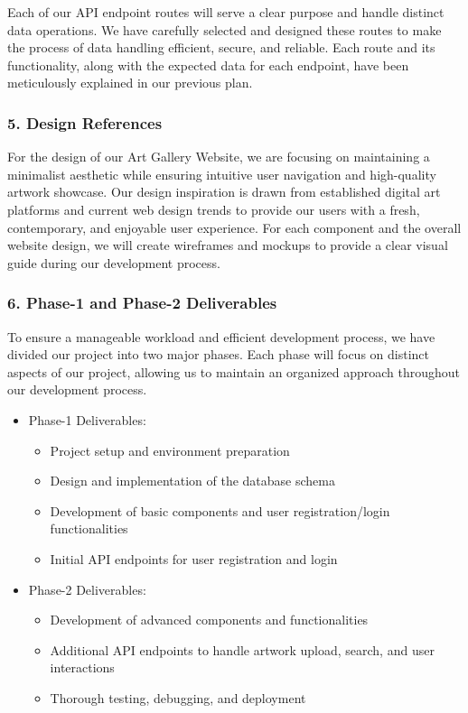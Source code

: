\documentclass[11pt]{article}
\begin{document}
Each of our API endpoint routes will serve a clear purpose and handle distinct
data operations. We have carefully selected and designed these routes to make
the process of data handling efficient, secure, and reliable. Each route and its
functionality, along with the expected data for each endpoint, have been
meticulously explained in our previous plan.

\subsubsection{5. Design References}
\label{sec:orge421bc7}

For the design of our Art Gallery Website, we are focusing on maintaining a
minimalist aesthetic while ensuring intuitive user navigation and high-quality
artwork showcase. Our design inspiration is drawn from established digital art
platforms and current web design trends to provide our users with a fresh,
contemporary, and enjoyable user experience. For each component and the overall
website design, we will create wireframes and mockups to provide a clear visual
guide during our development process.

\subsubsection{6. Phase-1 and Phase-2 Deliverables}
\label{sec:orgc10ff3b}

To ensure a manageable workload and efficient development process, we have
divided our project into two major phases. Each phase will focus on distinct
aspects of our project, allowing us to maintain an organized approach throughout
our development process.

\begin{itemize}
\item Phase-1 Deliverables:
\begin{itemize}
\item Project setup and environment preparation
\item Design and implementation of the database schema
\item Development of basic components and user registration/login functionalities
\item Initial API endpoints for user registration and login
\end{itemize}

\item Phase-2 Deliverables:
\begin{itemize}
\item Development of advanced components and functionalities
\item Additional API endpoints to handle artwork upload, search, and user interactions
\item Thorough testing, debugging, and deployment
\end{itemize}
\end{itemize}
\end{document}
